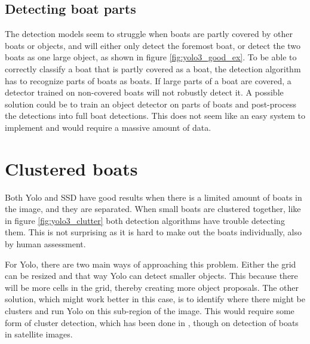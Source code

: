 \subsection{Detecting boat parts}
\label{sec:boat_parts}
The detection models seem to struggle when boats are partly covered by other boats or objects, and will either only detect the foremost boat, or detect the two boats as one large object, as shown in figure \ref{fig:yolo3_good_ex}. To be able to correctly classify a boat that is partly covered as a boat, the detection algorithm has to recognize parts of boats as boats. If large parts of a boat are covered, a detector trained on non-covered boats will not robustly detect it. A possible solution could be to train an object detector on parts of boats and post-process the detections into full boat detections. This does not seem like an easy system to implement and would require a massive amount of data. 



\section{Clustered boats}
Both Yolo and SSD have good results when there is a limited amount of boats in the image, and they are separated. When small boats are clustered together, like in figure \ref{fig:yolo3_clutter} both detection algorithms have trouble detecting them. This is not surprising as it is hard to make out the boats individually, also by human assessment. 

\vspace{3mm}

For Yolo, there are two main ways of approaching this problem. Either the grid can be resized and that way Yolo can detect smaller objects. This because there will be more cells in the grid, thereby creating more object proposals. The other solution, which might work better in this case, is to identify where there might be clusters and run Yolo on this sub-region of the image. This would require some form of cluster detection, which has been done in \citep{VanEtten}, though on detection of boats in satellite images. 

